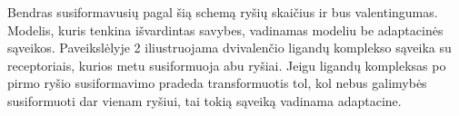 \documentclass[10pt]{article}
\begin{document}
           
          Bendras susiformavusių pagal šią schemą ryšių skaičius  ir bus valentingumas. Modelis, kuris tenkina išvardintas savybes, vadinamas modeliu  be adaptacinės sąveikos. Paveikslėlyje 2 iliustruojama dvivalenčio ligandų komplekso sąveika su receptoriais, kurios metu susiformuoja  abu ryšiai. Jeigu ligandų kompleksas po pirmo ryšio susiformavimo pradeda transformuotis tol, kol nebus galimybės susiformuoti dar vienam ryšiui, tai tokią sąveiką vadinama  adaptacine.  
          
          

\begin{figure}[t]
\end{figure}
\end{document}
